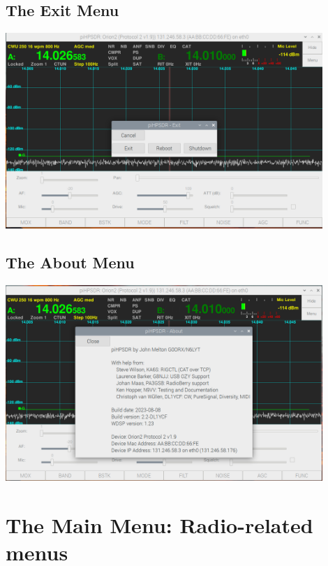 \documentclass[12pt]{book}
\begin{document}
\section{The Exit Menu}
\begin{center}
\includegraphics[width=12cm]{ExitMenu.png}
\end{center}

\section{The About Menu}
\begin{center}
\includegraphics[width=12cm]{AboutMenu.png}
\end{center}

\chapter{The Main Menu: Radio-related menus}
\end{document}
